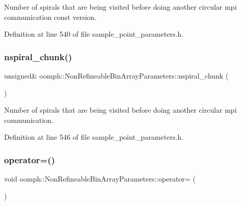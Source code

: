 Number of spirals that are being visited before doing another circular mpi communication const version. 



Definition at line 540 of file sample\+\_\+point\+\_\+parameters.\+h.

\mbox{\label{classoomph_1_1NonRefineableBinArrayParameters_a8815febdad327ff6c39d7e0c5e470033}} 
\subsubsection{\texorpdfstring{nspiral\+\_\+chunk()}{nspiral\_chunk()}\hspace{0.1cm}{\footnotesize\ttfamily [2/2]}}
{\footnotesize\ttfamily unsigned\& oomph\+::\+Non\+Refineable\+Bin\+Array\+Parameters\+::nspiral\+\_\+chunk (\begin{DoxyParamCaption}{ }\end{DoxyParamCaption})\hspace{0.3cm}{\ttfamily [inline]}}



Number of spirals that are being visited before doing another circular mpi communication. 



Definition at line 546 of file sample\+\_\+point\+\_\+parameters.\+h.

\mbox{\label{classoomph_1_1NonRefineableBinArrayParameters_a983009919c352b06ca15fd32169b10e6}} 
\subsubsection{\texorpdfstring{operator=()}{operator=()}}
{\footnotesize\ttfamily void oomph\+::\+Non\+Refineable\+Bin\+Array\+Parameters\+::operator= (\begin{DoxyParamCaption}\item[{const \hyperlink{classoomph_1_1NonRefineableBinArrayParameters}{Non\+Refineable\+Bin\+Array\+Parameters} \&}]{ }\end{DoxyParamCaption})\hspace{0.3cm}{\ttfamily [inline]}}



